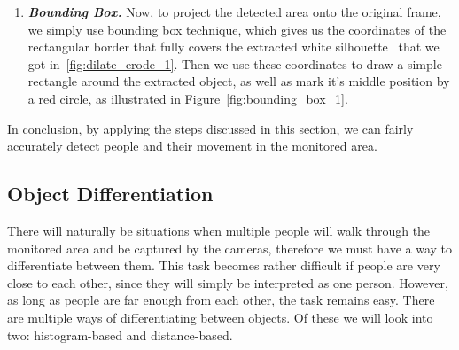 \begin{enumerate}
	\item \textit{\textbf{Bounding Box.}} Now, to project the detected area onto the original frame, we simply use bounding box technique, which gives us the coordinates of the rectangular border that fully covers the extracted white silhouette~\cite{bounding_box_1} that we got in~\ref{fig:dilate_erode_1}. Then we use these coordinates to draw a simple rectangle around the extracted object, as well as mark it's middle position by a red circle, as illustrated in Figure~\ref{fig:bounding_box_1}.
	\end{enumerate}
	
	In conclusion, by applying the steps discussed in this section, we can fairly accurately detect people and their movement in the monitored area.
	
\subsection{Object Differentiation}
\label{object_differentiation}
There will naturally be situations when multiple people will walk through the monitored area and be captured by the cameras, therefore we must have a way to differentiate between them. This task becomes rather difficult if people are very close to each other, since they will simply be interpreted as one person. However, as long as people are far enough from each other, the task remains easy. There are multiple ways of differentiating between objects. Of these we will look into two: histogram-based and distance-based.

